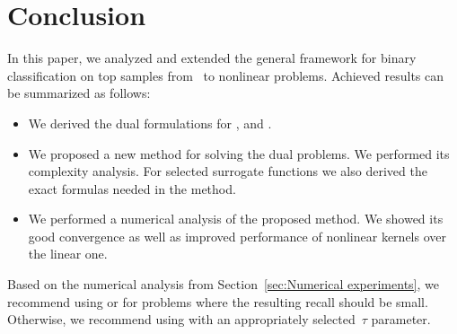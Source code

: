 \section{Conclusion}\label{sec:Conclusion}

In this paper, we analyzed and extended the general framework for binary classification on top samples from~\cite{adam2019patmat} to nonlinear problems. Achieved results can be summarized as follows:
\begin{itemize}
    \item We derived the dual formulations for \TopPush, \TopPushK and \PatMat.
    \item We proposed a new method for solving the dual problems. We performed its complexity analysis. For selected surrogate functions we also derived the exact formulas needed in the method.
    \item We performed a numerical analysis of the proposed method. We showed its good convergence as well as improved performance of nonlinear kernels over the linear one.
\end{itemize}
Based on the numerical analysis from Section~\ref{sec:Numerical experiments}, we recommend using \TopPush or \TopPushK for problems where the resulting recall should be small. Otherwise, we recommend using \PatMat with an appropriately selected~$\tau$ parameter.
